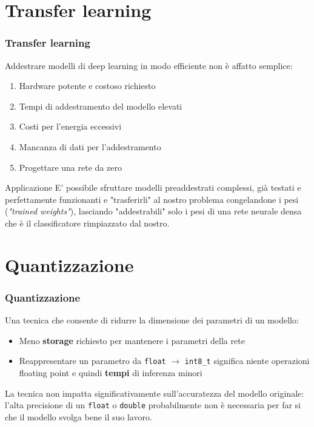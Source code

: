 \documentclass{beamer}
\newcommand{\dflvspace}{\vspace{10pt}}
\begin{document}
\section{Transfer learning}
\begin{frame}
    \frametitle{Transfer learning}
    
    Addestrare modelli di deep learning in modo efficiente non è affatto semplice:
    \begin{enumerate}
    	\item Hardware potente e costoso richiesto
    	\item Tempi di addestramento del modello elevati
    	\item Costi per l'energia eccessivi
    	\item Mancanza di dati per l'addestramento
    	\item Progettare una rete da zero
    \end{enumerate}
    
    \dflvspace
    
    \begin{exampleblock}{Applicazione}
    E' possibile sfruttare modelli preaddestrati complessi, già testati e perfettamente funzionanti e "trasferirli" al
    nostro problema congelandone i pesi (\textit{"trained weights"}), lasciando "addestrabili" solo i pesi di una rete neurale densa che è il
    classificatore rimpiazzato dal nostro.
    \end{exampleblock}
\end{frame}

\section{Quantizzazione}
\begin{frame}
	\frametitle{Quantizzazione}
	
	Una tecnica che consente di ridurre la dimensione dei parametri di un modello:
	\begin{itemize}
		\item Meno \textbf{storage} richiesto per mantenere i parametri della rete
		\item Reappresentare un parametro da \texttt{float} $\rightarrow$ \texttt{int8\_t} significa niente
		operazioni floating point e quindi \textbf{tempi} di inferenza minori
	\end{itemize}
	
	\dflvspace
	
	La tecnica non impatta significativamente sull'accuratezza del modello originale: l'alta precisione
	di un \texttt{float} o \texttt{double} probabilmente non è necessaria per far si che il modello
	svolga bene il suo lavoro.
	
\end{frame}
\end{document}
